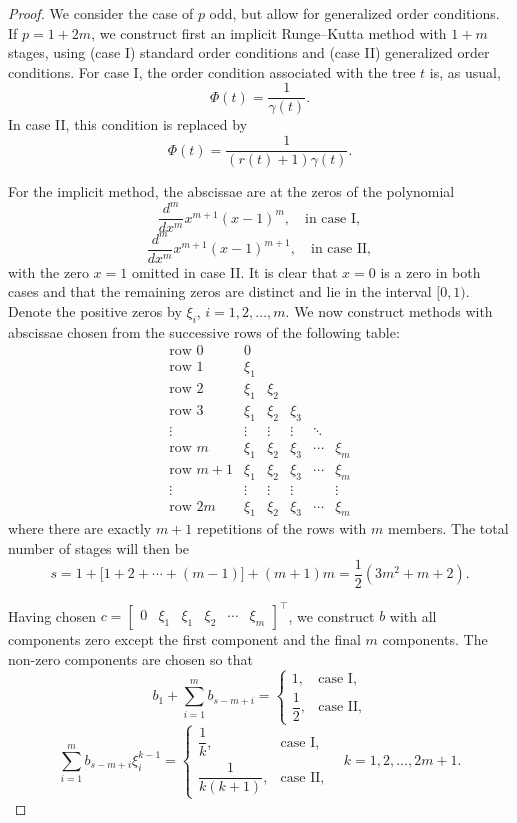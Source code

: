 \begin{proof}
We consider the case of $p$ odd, but allow for generalized order conditions. If $p = 1 + 2m$, we construct first an implicit Runge--Kutta method with $1 + m$ stages, using (case I) standard order conditions and (case II) generalized order conditions. For case I, the order condition associated with the tree $t$ is, as usual,
\[
\Phi(t) = \frac{1}{\gamma(t)}.
\]
In case II, this condition is replaced by
\[
\Phi(t) = \frac{1}{(r(t) + 1)\gamma(t)}.
\]

For the implicit method, the abscissae are at the zeros of the polynomial
\[
\frac{d^m}{dx^m} x^{m+1}(x - 1)^m, \quad \text{in case I},
\]
\[
\frac{d^m}{dx^m} x^{m+1}(x - 1)^{m+1}, \quad \text{in case II},
\]
with the zero $x = 1$ omitted in case II. It is clear that $x = 0$ is a zero in both cases and that the remaining zeros are distinct and lie in the interval $[0, 1)$. Denote the positive zeros by $\xi_i$, $i = 1, 2, \dots, m$. We now construct methods with abscissae chosen from the successive rows of the following table:
\[
\begin{array}{ccccccc}
\text{row } 0 & 0 \\
\text{row } 1 & \xi_1 \\
\text{row } 2 & \xi_1 & \xi_2 \\
\text{row } 3 & \xi_1 & \xi_2 & \xi_3 \\
\vdots & \vdots & \vdots & \vdots & \ddots \\
\text{row } m & \xi_1 & \xi_2 & \xi_3 & \cdots & \xi_m \\
\text{row } m + 1 & \xi_1 & \xi_2 & \xi_3 & \cdots & \xi_m \\
\vdots & \vdots & \vdots & \vdots & & \vdots \\
\text{row } 2m & \xi_1 & \xi_2 & \xi_3 & \cdots & \xi_m
\end{array}
\]
where there are exactly $m + 1$ repetitions of the rows with $m$ members. The total number of stages will then be
\[
s = 1 + \bigl[1 + 2 + \cdots + (m - 1)\bigr] + (m + 1)m = \frac{1}{2}(3m^2 + m + 2).
\]

Having chosen $c = \begin{bmatrix} 0 & \xi_1 & \xi_1 & \xi_2 & \cdots & \xi_m \end{bmatrix}^\top$, we construct $b$ with all components zero except the first component and the final $m$ components. The non-zero components are chosen so that
\[
b_1 + \sum_{i=1}^m b_{s-m+i} = \begin{cases}
1, & \text{case I}, \\[4pt]
\dfrac{1}{2}, & \text{case II},
\end{cases}
\]
\[
\sum_{i=1}^m b_{s-m+i} \xi_i^{k-1} = \begin{cases}
\dfrac{1}{k}, & \text{case I}, \\[8pt]
\dfrac{1}{k(k+1)}, & \text{case II},
\end{cases} \quad k = 1, 2, \dots, 2m + 1.
\]


\end{proof}
